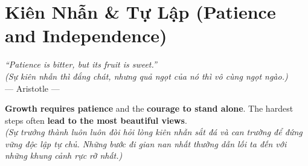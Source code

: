 \chapter{Kiên Nhẫn \& Tự Lập (Patience and Independence)}

\begin{center}
  \textit{\color{truyenblue}``Patience is bitter, but its fruit is sweet.''}\\
  \textit{(Sự kiên nhẫn thì đắng chát, nhưng quả ngọt của nó thì vô cùng ngọt ngào.)}\\[4pt]
  \small\color{truyengold}--- Aristotle ---
\end{center}

\ngancach

\begin{tcolorbox}[
  colback=truyenred!5, colframe=truyenred!40, arc=6pt,
  title={\bfseries Trưởng Thành Từ Gian Khó (Growing From Hardships)},
  fonttitle=\bfseries\color{truyenred}
]
  \textbf{Growth requires patience} and the \textbf{courage to stand alone}. The hardest steps often \textbf{lead to the most beautiful views}.\\
  \textit{(Sự trưởng thành luôn luôn đòi hỏi lòng kiên nhẫn sắt đá và can trường để đứng vững độc lập tự chủ. Những bước đi gian nan nhất thường dẫn lối ta đến với những khung cảnh rực rỡ nhất.)}
\end{tcolorbox}

\vspace{0.6cm}

\ngayDay{}
